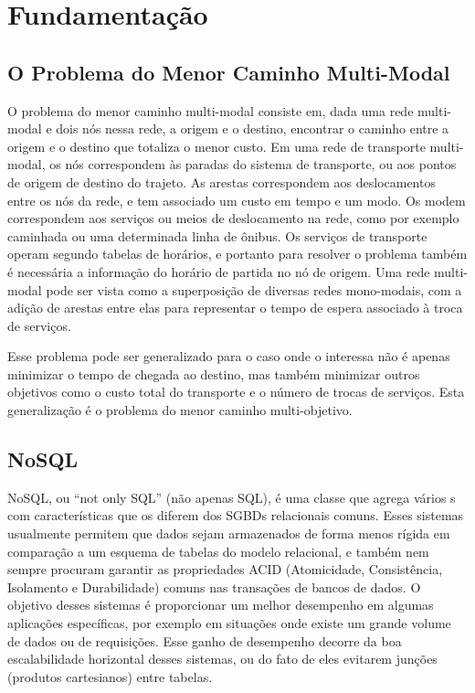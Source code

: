 
\chapter{Fundamentação}

\section{O Problema do Menor Caminho Multi-Modal}


O problema do menor caminho multi-modal consiste em, dada uma rede multi-modal e dois nós nessa rede, a origem e o destino, encontrar o caminho entre a origem e o destino que totaliza o menor custo.
Em uma rede de transporte multi-modal, os nós correspondem às paradas do sistema de transporte, ou aos pontos de origem de destino do trajeto. As arestas correspondem aos deslocamentos entre os nós da rede, e tem associado um custo em tempo e um modo. Os modem correspondem aos serviços ou meios de deslocamento na rede, como por exemplo caminhada ou uma determinada linha de ônibus.
Os serviços de transporte operam segundo tabelas de horários, e portanto para resolver o problema também é necessária a informação do horário de partida no nó de origem.
Uma rede multi-modal pode ser vista como a superposição de diversas redes mono-modais, com a adição de arestas entre elas para representar o tempo de espera associado à troca de serviços.

Esse problema pode ser generalizado para o caso onde o interessa não é apenas minimizar o tempo de chegada ao destino, mas também minimizar outros objetivos como o custo total do transporte e o número de trocas de serviços. Esta generalização é o problema do menor caminho multi-objetivo.

\section{NoSQL}

NoSQL, ou ``not only SQL'' (não apenas SQL), é uma classe que agrega vários s com características que os diferem dos SGBDs relacionais comuns.
Esses sistemas usualmente permitem que dados sejam armazenados de forma menos rígida em comparação a um esquema de tabelas do modelo relacional, e também nem sempre procuram garantir as propriedades ACID (Atomicidade, Consistência, Isolamento e Durabilidade) comuns nas transações de bancos de dados.
O objetivo desses sistemas é proporcionar um melhor desempenho em algumas aplicações específicas, por exemplo em situações onde existe um grande volume de dados ou de requisições. Esse ganho de desempenho decorre da boa escalabilidade horizontal desses sistemas, ou do fato de eles evitarem junções (produtos cartesianos) entre tabelas.

